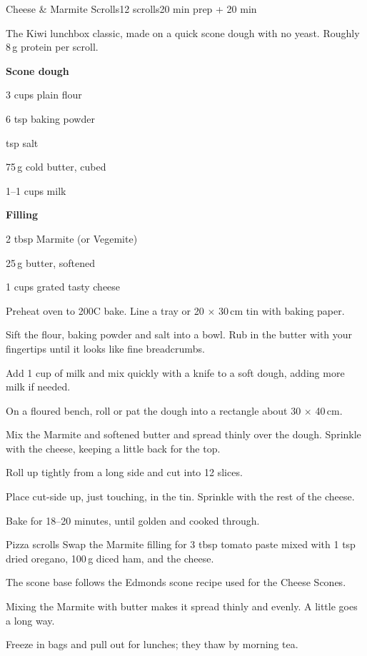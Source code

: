 \begin{recipebox}{Cheese \& Marmite Scrolls}{12 scrolls}{20 min prep + 20 min}

The Kiwi lunchbox classic, made on a quick scone dough with no yeast.
Roughly 8\,g protein per scroll.

\begin{ingredients}
  \item[] \textbf{Scone dough}
  \item 3 cups plain flour
  \item 6 tsp baking powder
  \item {} tsp salt
  \item 75\,g cold butter, cubed
  \item 1--1 cups milk
  \item[] \textbf{Filling}
  \item 2 tbsp Marmite (or Vegemite)
  \item 25\,g butter, softened
  \item 1 cups grated tasty cheese
\end{ingredients}

\begin{method}
  \item Preheat oven to 200\degree C bake. Line a tray or 20 $\times$ 30\,cm tin with baking paper.
  \item Sift the flour, baking powder and salt into a bowl. Rub in the butter with your fingertips until it looks like fine breadcrumbs.
  \item Add 1 cup of milk and mix quickly with a knife to a soft dough, adding more milk if needed.
  \item On a floured bench, roll or pat the dough into a rectangle about 30 $\times$ 40\,cm.
  \item Mix the Marmite and softened butter and spread thinly over the dough. Sprinkle with the cheese, keeping a little back for the top.
  \item Roll up tightly from a long side and cut into 12 slices.
  \item Place cut-side up, just touching, in the tin. Sprinkle with the rest of the cheese.
  \item Bake for 18--20 minutes, until golden and cooked through.
\end{method}

\begin{variationbox}{Pizza scrolls}
Swap the Marmite filling for 3 tbsp tomato paste mixed with 1 tsp dried oregano, 100\,g diced ham, and the cheese.
\end{variationbox}

\begin{notelist}
  \item The scone base follows the Edmonds scone recipe used for the Cheese Scones.
  \item Mixing the Marmite with butter makes it spread thinly and evenly. A little goes a long way.
  \item Freeze in bags and pull out for lunches; they thaw by morning tea.
\end{notelist}

\end{recipebox}
